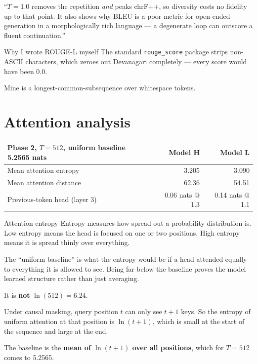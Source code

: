 \documentclass[11pt]{report}
\newcommand{\p}[1]{\texttt{#1}}
\begin{document}
\begin{saybox}
``$T=1.0$ removes the repetition \emph{and} peaks chrF++, so diversity costs no
fidelity up to that point. It also shows why BLEU is a poor metric for
open-ended generation in a morphologically rich language --- a degenerate loop
can outscore a fluent continuation.''
\end{saybox}

\begin{implementation}{Why I wrote ROUGE-L myself}
The standard \p{rouge\_score} package strips non-ASCII characters, which zeroes
out Devanagari completely --- every score would have been 0.0.

Mine is a longest-common-subsequence over whitespace tokens.
\end{implementation}

\section{Attention analysis}

\begin{center}
\begin{tabular}{@{}lrr@{}}
\toprule
Phase 2, $T = 512$, uniform baseline 5.2565 nats & \textbf{Model H} & \textbf{Model L} \\
\midrule
Mean attention entropy & 3.205 & 3.090 \\
Mean attention distance & 62.36 & 54.51 \\
Previous-token head (layer 3) & 0.06 nats @ 1.3 & 0.14 nats @ 1.1 \\
\bottomrule
\end{tabular}
\end{center}

\begin{concept}{Attention entropy}
Entropy measures how spread out a probability distribution is. Low entropy means
the head is focused on one or two positions. High entropy means it is spread
thinly over everything.

The ``uniform baseline'' is what the entropy would be if a head attended equally
to everything it is allowed to see. Being far below the baseline proves the
model learned structure rather than just averaging.
\end{concept}

\begin{warnbox}
It is \textbf{not} $\ln(512) = 6.24$.

Under causal masking, query position $t$ can only see $t+1$ keys. So the entropy
of uniform attention at that position is $\ln(t+1)$, which is small at the start
of the sequence and large at the end.

The baseline is the \textbf{mean of $\ln(t+1)$ over all positions}, which for
$T = 512$ comes to 5.2565.
\end{warnbox}
\end{document}
